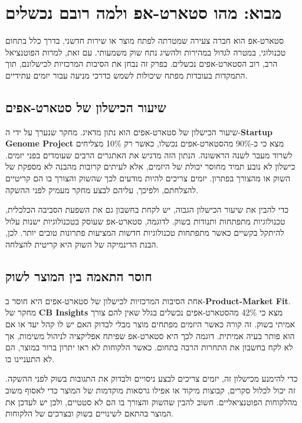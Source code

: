 \chapter{מבוא: מהו סטארט-אפ ולמה רובם נכשלים}

סטארט-אפ הוא חברה צעירה שמטרתה לפתח מוצר או שירות חדשני, בדרך כלל בתחום טכנולוגי, במטרה לגדול במהירות ולהשיג נתח שוק משמעותי. עם זאת, למרות הפוטנציאל הרב, רוב הסטארט-אפים נכשלים. בפרק זה נבחן את הסיבות המרכזיות לכישלונם, תוך התמקדות בעובדות מפתח שיכולות לשמש כדרכי מניעה עבור יזמים עתידיים.

\section{שיעור הכישלון של סטארט-אפים}

שיעור הכישלון של סטארט-אפים הוא נתון מדאיג. מחקר שנערך על ידי ה-\textbf{Startup Genome Project} מצא כי כ-90\% מהסטארט-אפים נכשלו, כאשר רק 10\% מצליחים לשרוד מעבר לשנה הראשונה. הנתון הזה מדגיש את האתגרים הרבים שעומדים בפני יזמים. כישלון לא נובע תמיד מחוסר יכולת של היזמים, אלא לעיתים קרובות מהבנה לא מספקת של השוק או מהצורך בפתרון. יזמים צריכים להיות מודעים לכך שהשוק והצורך בו הם קריטיים להצלחתם, ולפיכך, עליהם לבצע מחקר מעמיק לפני ההשקה.

כדי להבין את שיעור הכישלון הגבוה, יש לקחת בחשבון גם את השפעת הסביבה הכלכלית, טכנולוגיות מתפתחות ותנודות בשוק. לדוגמה, סטארט-אפ שעוסק בטכנולוגיות ישנות עלול להיתקל בקשיים כאשר מתפתחות טכנולוגיות חדשות המציעות פתרונות טובים יותר. לכן, הבנת הדינמיקה של השוק היא קריטית להצלחה.

\section{חוסר התאמה בין המוצר לשוק}

אחת הסיבות המרכזיות לכישלון של סטארט-אפים היא חוסר ב-\textbf{Product-Market Fit}. מחקר של \textbf{CB Insights} מצא כי 42\% מהסטארט-אפים נכשלים בגלל שאין להם צורך אמיתי בשוק. זה קורה כאשר היזמים מפתחים מוצר מבלי לבדוק האם יש לו קהל יעד או אם הוא פותר בעיה אמיתית. דוגמה לכך היא סטארט-אפ שפיתח אפליקציה לניהול משימות, אך לא לקח בחשבון את התחרות הרבה בתחום. כאשר הלקוחות לא ראו יתרון ברור במוצר, הם לא התעניינו בו.

כדי להימנע מכישלון זה, יזמים צריכים לבצע ניסויים ולבדוק את התגובות בשוק לפני ההשקה. זה יכול לכלול סקרים, קבוצות מיקוד או אפילו גרסאות מוקדמות של המוצר  כדי לאסוף משוב מהלקוחות הפוטנציאליים. חשוב להבין שהשוק והצורך בו הם לא סטטיים, ולכן יש לעדכן את המוצר בהתאם לשינויים בשוק ובצרכים של הלקוחות.

